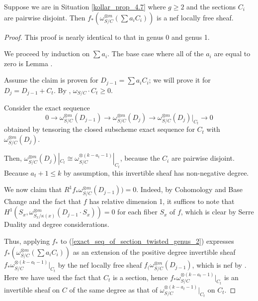 \begin{lemma}\label{inductive_step_genus_2}
Suppose we are in Situation \ref{kollar_prop_4.7} where $g\ge2$ and the sections $C_i$ are pairwise disjoint.
Then $f_{*}(\omega_{S/C}^{\otimes m}(\sum a_iC_i))$ is a nef locally free sheaf.
\end{lemma}
\begin{proof}
This proof is nearly identical to that in genus 0 and genus 1.

We proceed by induction on $\sum a_i$.
The base case where all of the $a_i$ are equal to zero is Lemma .

Assume the claim is proven for $D_{j-1}=\sum a_iC_i$; we will prove it for $D_{j}=D_{j-1}+C_t$.
By , $\omega_{S/C}\cdot C_t\ge0$.

Consider the exact sequence
\begin{equation*}\label{exact_seq_of_section_twisted_genus_2}
0\to\omega_{S/C}^{\otimes m}(D_{j-1})\to\omega_{S/C}^{\otimes m}(D_j)\to \omega_{S/C}^{\otimes m}(D_j)|_{C_t}\to0
\end{equation*}
obtained by tensoring the closed subscheme exact sequence for $C_t$ with $\omega_{S/C}^{\otimes m}(D_j)$.

Then, $\omega_{S/C}^{\otimes m}(D_j)|_{C_t}\cong \omega_{S/C}^{\otimes (k-a_{t}-1)}|_{C_t}$, because the $C_i$ are pairwise disjoint.
Because $a_{t}+1\le k$ by assumption, this invertible sheaf has non-negative degree.

We now claim that $R^{1}f_{*}\omega_{S/C}^{\otimes m}(D_{j-1}))=0$.
Indeed, by Cohomology and Base Change and the fact that $f$ has relative dimension 1, it suffices to note that $H^{1}(S_x,\omega_{S_x/\kappa(x)}^{\otimes m}(D_{j-1}\cdot S_x))=0$ for each fiber $S_x$ of $f$, which is clear by Serre Duality and degree considerations.

Thus, applying $f_{*}$ to (\ref{exact_seq_of_section_twisted_genus_2}) expresses $f_{*}(\omega_{S/C}^{\otimes m}(\sum a_iC_i))$ as an extension of the positive degree invertible sheaf $f_{*}\omega_{S/C}^{\otimes (k-a_{t}-1)}|_{C_t}$ by the nef locally free sheaf $f_{(}\omega_{S/C}^{\otimes m}(D_{j-1})$, which is nef by .
Here we have used the fact that $C_t$ is a section, hence $f_{*}\omega_{S/C}^{\otimes (k-a_{t}-1)}|_{C_t}$ is an invertible sheaf on $C$ of the same degree as that of $\omega_{S/C}^{\otimes (k-a_{t}-1)}|_{C_t}$ on $C_t$.
\end{proof}

